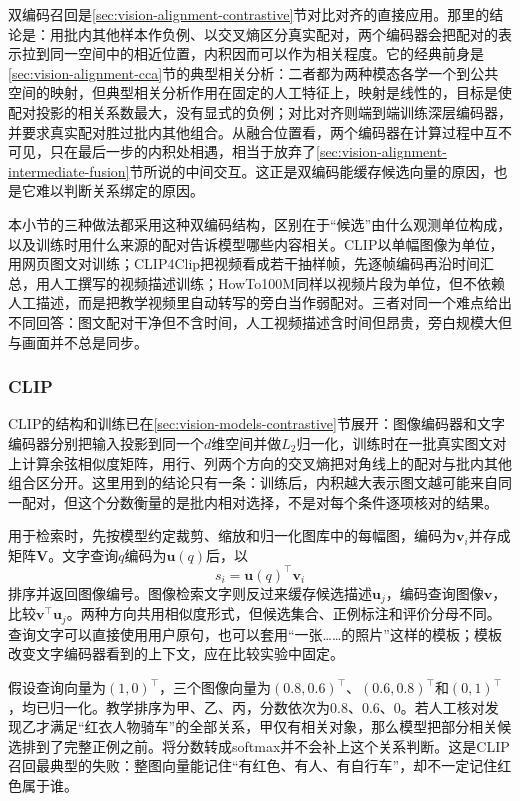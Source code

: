双编码召回是\ref{sec:vision-alignment-contrastive}节对比对齐的直接应用。那里的结论是：用批内其他样本作负例、以交叉熵区分真实配对，两个编码器会把配对的表示拉到同一空间中的相近位置，内积因而可以作为相关程度。它的经典前身是\ref{sec:vision-alignment-cca}节的典型相关分析：二者都为两种模态各学一个到公共空间的映射，但典型相关分析作用在固定的人工特征上，映射是线性的，目标是使配对投影的相关系数最大，没有显式的负例；对比对齐则端到端训练深层编码器，并要求真实配对胜过批内其他组合。从融合位置看，两个编码器在计算过程中互不可见，只在最后一步的内积处相遇，相当于放弃了\ref{sec:vision-alignment-intermediate-fusion}节所说的中间交互。这正是双编码能缓存候选向量的原因，也是它难以判断关系绑定的原因。

本小节的三种做法都采用这种双编码结构，区别在于“候选”由什么观测单位构成，以及训练时用什么来源的配对告诉模型哪些内容相关。CLIP以单幅图像为单位，用网页图文对训练；CLIP4Clip把视频看成若干抽样帧，先逐帧编码再沿时间汇总，用人工撰写的视频描述训练；HowTo100M同样以视频片段为单位，但不依赖人工描述，而是把教学视频里自动转写的旁白当作弱配对。三者对同一个难点给出不同回答：图文配对干净但不含时间，人工视频描述含时间但昂贵，旁白规模大但与画面并不总是同步。

\subsubsection{CLIP}
\label{sec:vision-understanding-clip}

CLIP的结构和训练已在\ref{sec:vision-models-contrastive}节展开：图像编码器和文字编码器分别把输入投影到同一个$d$维空间并做$L_2$归一化，训练时在一批真实图文对上计算余弦相似度矩阵，用行、列两个方向的交叉熵把对角线上的配对与批内其他组合区分开。这里用到的结论只有一条：训练后，内积越大表示图文越可能来自同一配对，但这个分数衡量的是批内相对选择，不是对每个条件逐项核对的结果。

用于检索时，先按模型约定裁剪、缩放和归一化图库中的每幅图，编码为$\bm v_i$并存成矩阵$\bm V$。文字查询$q$编码为$\bm u(q)$后，以
\[
  s_i=\bm u(q)^\top\bm v_i
\]
排序并返回图像编号。图像检索文字则反过来缓存候选描述$\bm u_j$，编码查询图像$\bm v$，比较$\bm v^\top\bm u_j$。两种方向共用相似度形式，但候选集合、正例标注和评价分母不同。查询文字可以直接使用用户原句，也可以套用“一张……的照片”这样的模板；模板改变文字编码器看到的上下文，应在比较实验中固定。

假设查询向量为$(1,0)^\top$，三个图像向量为$(0.8,0.6)^\top$、$(0.6,0.8)^\top$和$(0,1)^\top$，均已归一化。教学排序为甲、乙、丙，分数依次为0.8、0.6、0。若人工核对发现乙才满足“红衣人物骑车”的全部关系，甲仅有相关对象，那么模型把部分相关候选排到了完整正例之前。将分数转成softmax并不会补上这个关系判断。这是CLIP召回最典型的失败：整图向量能记住“有红色、有人、有自行车”，却不一定记住红色属于谁。

